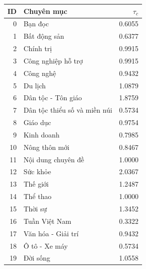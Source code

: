 \begin{tabularx}{\linewidth}{r>{\raggedright\arraybackslash}Xr}
\toprule
ID & Chuyên mục & $\tau_c$\\\midrule
0 & Bạn đọc & 0.6055\\
1 & Bất động sản & 0.6377\\
2 & Chính trị & 0.9915\\
3 & Công nghiệp hỗ trợ & 0.9915\\
4 & Công nghệ & 0.9432\\
5 & Du lịch & 1.0879\\
6 & Dân tộc - Tôn giáo & 1.8759\\
7 & Dân tộc thiểu số và miền núi & 0.5734\\
8 & Giáo dục & 0.9754\\
9 & Kinh doanh & 0.7985\\
10 & Nông thôn mới & 0.8467\\
11 & Nội dung chuyên đề & 1.0000\\
12 & Sức khỏe & 2.0367\\
13 & Thế giới & 1.2487\\
14 & Thể thao & 1.0000\\
15 & Thời sự & 1.3452\\
16 & Tuần Việt Nam & 0.3322\\
17 & Văn hóa - Giải trí & 0.9432\\
18 & Ô tô - Xe máy & 0.5734\\
19 & Đời sống & 1.0558\\
\bottomrule\end{tabularx}

